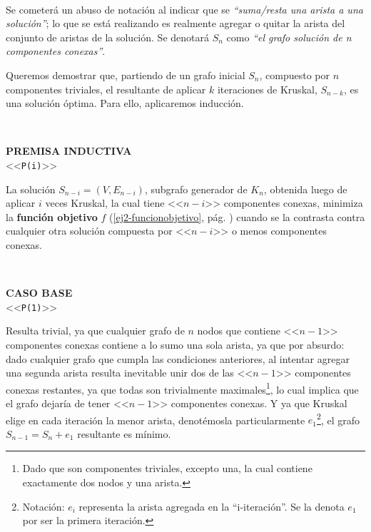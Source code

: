 \documentclass[11pt, a4paper, twoside]{article}
\begin{document}
\begin{paragraph}\


\begin{aclaracion}

Se cometerá un abuso de notación al indicar que se \emph{``suma/resta una
arista a una solución''}; lo que se está realizando es realmente agregar o
quitar la arista del conjunto de aristas de la solución. Se denotará $S_{n}$
como \emph{``el grafo solución de n componentes conexas''}.

\end{aclaracion}

Queremos demostrar que, partiendo de un grafo inicial $S_{n}$, compuesto por
$n$ componentes triviales, el resultante de aplicar $k$ iteraciones de
Kruskal, $S_{n-k}$, es una solución óptima. Para ello, aplicaremos inducción.

\end{paragraph}

\begin{paragraph}\
%
%
\begin{center}
\textbf{PREMISA INDUCTIVA}\\
<<\texttt{P(i)}>>
\end{center}

La solución $S_{n-i}=(V,E_{n-i})$, subgrafo generador de $K_n$, obtenida luego
de aplicar $i$ veces Kruskal, la cual tiene <<$n-i$>> componentes conexas,
minimiza la \textbf{función objetivo} $f$ (\ref{ej2-funcionobjetivo}, pág.
\pageref{ej2-funcionobjetivo}) cuando se la contrasta contra cualquier otra
solución compuesta por <<$n-i$>> o menos componentes conexas.

\end{paragraph}

\begin{paragraph}\
%
%
\begin{center}
\textbf{CASO BASE}\\
<<\texttt{P(1)}>>
\end{center}

Resulta trivial, ya que cualquier grafo de $n$ nodos que contiene <<$n-1$>>
componentes conexas contiene a lo sumo una sola arista, ya que por absurdo:
dado cualquier grafo que cumpla las condiciones anteriores, al intentar
agregar una segunda arista resulta inevitable unir dos de las <<$n-1$>>
componentes conexas restantes, ya que todas son trivialmente
maximales\footnote{Dado que son componentes triviales, excepto una, la cual
contiene exactamente dos nodos y una arista.}, lo cual implica que el grafo
dejaría de tener <<$n-1$>> componentes conexas. Y ya que Kruskal elige en cada
iteración la menor arista, denotémosla particularmente
$e_{1}$\footnote{Notación: $e_{i}$ representa la arista agregada en la
``i-iteración''. Se la denota $e_{1}$ por ser la primera iteración.}, el grafo
$S_{n-1} = S_{n} + e_{1}$ resultante es mínimo.

\end{paragraph}
\end{document}
